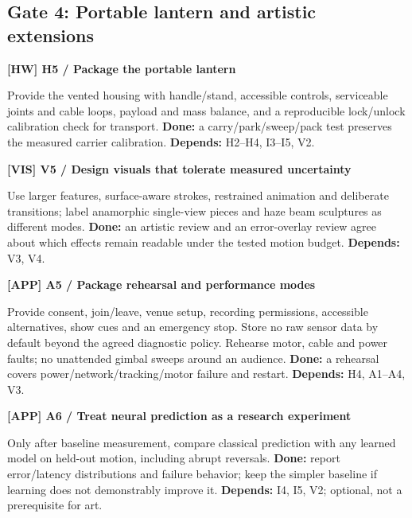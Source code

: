 \documentclass[11pt,a4paper]{article}
\newcommand{\task}[4]{%
  \begin{tcolorbox}[colback=#1!5,colframe=#1,boxrule=0.5pt,
    borderline west={2pt}{0pt}{#1}]
  \textcolor{#1}{\textbf{[#2] #3}}\par #4
  \end{tcolorbox}}
\begin{document}
\subsection{Gate 4: Portable lantern and artistic extensions}
\task{HW}{HW}{H5 / Package the portable lantern}{
Provide the vented housing with handle/stand, accessible controls,
serviceable joints and cable loops, payload and mass balance, and a
reproducible lock/unlock calibration check for transport.
\textbf{Done:} a carry/park/sweep/pack test preserves the measured
carrier calibration. \textbf{Depends:} H2--H4, I3--I5, V2.}
\task{VIS}{VIS}{V5 / Design visuals that tolerate measured uncertainty}{
Use larger features, surface-aware strokes, restrained animation and
deliberate transitions; label anamorphic single-view pieces and haze
beam sculptures as different modes.
\textbf{Done:} an artistic review and an error-overlay review agree about
which effects remain readable under the tested motion budget.
\textbf{Depends:} V3, V4.}
\task{APP}{APP}{A5 / Package rehearsal and performance modes}{
Provide consent, join/leave, venue setup, recording permissions, accessible
alternatives, show cues and an emergency stop. Store no raw sensor data by
default beyond the agreed diagnostic policy. Rehearse motor, cable and
power faults; no unattended gimbal sweeps around an audience.
\textbf{Done:} a rehearsal covers power/network/tracking/motor failure and
restart. \textbf{Depends:} H4, A1--A4, V3.}
\task{APP}{APP}{A6 / Treat neural prediction as a research experiment}{
Only after baseline measurement, compare classical prediction with any
learned model on held-out motion, including abrupt reversals.
\textbf{Done:} report error/latency distributions and failure behavior;
keep the simpler baseline if learning does not demonstrably improve it.
\textbf{Depends:} I4, I5, V2; optional, not a prerequisite for art.}
\end{document}
